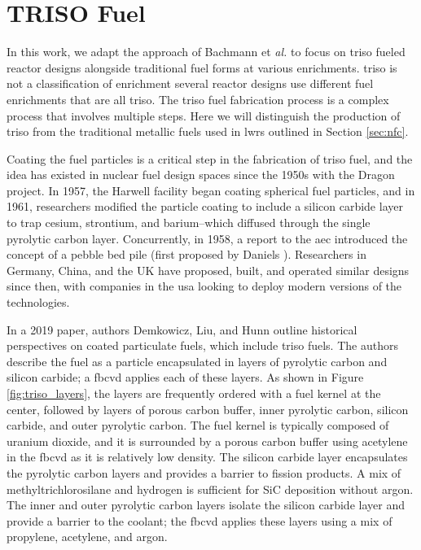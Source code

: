 \section{TRISO Fuel}
\label{sec:triso_fuel}

In this work, we adapt the approach of Bachmann et \textit{al.}
\cite{bachmann_enrichment_2021} to focus on \gls{triso} fueled reactor designs
alongside traditional fuel forms at various enrichments. \gls{triso} is not a
classification of enrichment several reactor designs use different fuel
enrichments that are all \gls{triso}. The \gls{triso} fuel fabrication process
is a complex process that involves multiple steps. Here we will distinguish the
production of \gls{triso} from the traditional metallic fuels used in
\glspl{lwr} outlined in Section \ref{sec:nfc}.

Coating the fuel particles is a critical step in the fabrication of \gls{triso}
fuel, and the idea has existed in nuclear fuel design spaces since the 1950s
\cite{price_dragon_2012} with the Dragon project. In 1957, the Harwell facility
began coating spherical fuel particles, and in 1961, researchers modified the
particle coating to include a silicon carbide layer to trap cesium, strontium,
and barium--which diffused through the single pyrolytic carbon layer.
Concurrently, in 1958, a report to the \gls{aec} introduced the concept of a
pebble bed pile (first proposed by Daniels
\cite{f_b_daniels_suggestions_1944}). Researchers in Germany, China, and the UK
have proposed, built, and operated similar designs since then, with companies
in the \gls{usa} looking to deploy modern versions of the technologies.

In a 2019 paper, authors Demkowicz, Liu, and Hunn \cite{particle_review_2019}
outline historical perspectives on coated particulate fuels, which include
\gls{triso} fuels. The authors describe the fuel as a particle encapsulated in
layers of pyrolytic carbon and silicon carbide; a \gls{fbcvd} applies each of
these layers. As shown in Figure \ref{fig:triso_layers}, the layers are
frequently ordered with a fuel kernel at the center, followed by layers of
porous carbon buffer, inner pyrolytic carbon, silicon carbide, and outer
pyrolytic carbon. The fuel kernel is typically composed of uranium dioxide, and
it is surrounded by a porous carbon buffer using acetylene in the \gls{fbcvd}
as it is relatively low density. The silicon carbide layer encapsulates the
pyrolytic carbon layers and provides a barrier to fission products. A mix of
methyltrichlorosilane and hydrogen is sufficient for SiC deposition without
argon. The inner and outer pyrolytic carbon layers isolate the silicon carbide
layer and provide a barrier to the coolant; the \gls{fbcvd} applies these
layers using a mix of propylene, acetylene, and argon.

